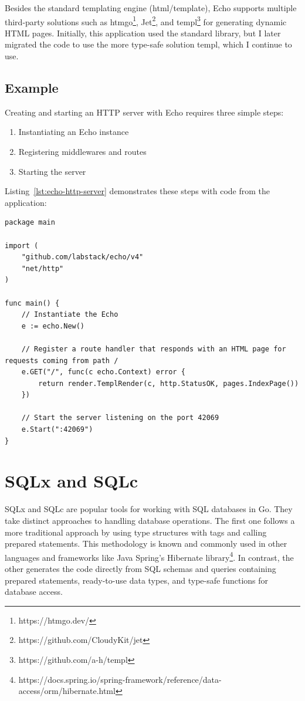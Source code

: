 Besides the standard templating engine (html/template), Echo supports multiple third-party solutions such as htmgo\footnote{https://htmgo.dev/}, Jet\footnote{https://github.com/CloudyKit/jet}, and templ\footnote{https://github.com/a-h/templ} for generating dynamic HTML pages. Initially, this application used the standard library, but I later migrated the code to use the more type-safe solution templ, which I continue to use.

\subsection{Example}

Creating and starting an HTTP server with Echo requires three simple steps:
\begin{enumerate}
\item Instantiating an Echo instance
\item Registering middlewares and routes
\item Starting the server
\end{enumerate}

Listing~\ref{lst:echo-http-server} demonstrates these steps with code from the application:

\begin{lstlisting}[caption=Starting an Echo HTTP server,label=lst:echo-http-server, float]
package main

import (
    "github.com/labstack/echo/v4"
    "net/http"
)

func main() {
    // Instantiate the Echo
    e := echo.New()

    // Register a route handler that responds with an HTML page for requests coming from path /
    e.GET("/", func(c echo.Context) error {
        return render.TemplRender(c, http.StatusOK, pages.IndexPage())
    })

    // Start the server listening on the port 42069
    e.Start(":42069")
}

\end{lstlisting}

\section{SQLx and SQLc}

SQLx and SQLc are popular tools for working with SQL databases in Go. They take distinct approaches to handling database operations. The first one follows a more traditional approach by using type structures with tags and calling prepared statements. This methodology is known and commonly used in other languages and frameworks like Java Spring's Hibernate library\footnote{https://docs.spring.io/spring-framework/reference/data-access/orm/hibernate.html}. In contrast, the other generates the code directly from SQL schemas and queries containing prepared statements, ready-to-use data types, and type-safe functions for database access.

